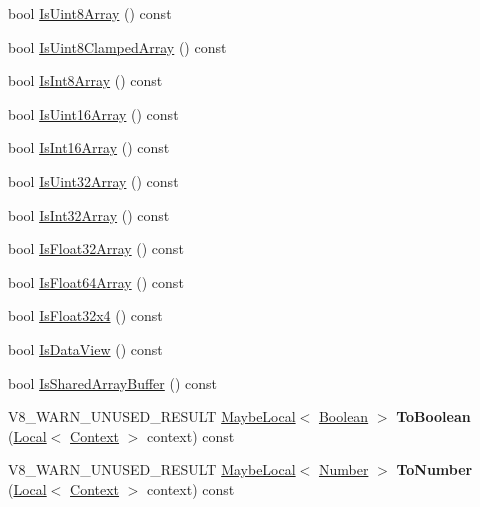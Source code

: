 \begin{DoxyCompactItemize}
bool \hyperlink{classv8_1_1Value_acbe2cd9c9cce96ee498677ba37c8466d}{Is\+Uint8\+Array} () const 
\item 
bool \hyperlink{classv8_1_1Value_ad3cb464ab5ef0215bd2cbdd4eb2b7e3d}{Is\+Uint8\+Clamped\+Array} () const 
\item 
bool \hyperlink{classv8_1_1Value_a10a88a2794271dfcd9c3abd565e8f28a}{Is\+Int8\+Array} () const 
\item 
bool \hyperlink{classv8_1_1Value_a4a45fabf58b241f5de3086a3dd0a09ae}{Is\+Uint16\+Array} () const 
\item 
bool \hyperlink{classv8_1_1Value_a928c586639dd75ae4efdaa66b1fc4d50}{Is\+Int16\+Array} () const 
\item 
bool \hyperlink{classv8_1_1Value_a5e39229dc74d534835cf4ceba10676f4}{Is\+Uint32\+Array} () const 
\item 
bool \hyperlink{classv8_1_1Value_a48eac78a49c8b42d9f8cf05c514b3750}{Is\+Int32\+Array} () const 
\item 
bool \hyperlink{classv8_1_1Value_a4effc7ca1a221dd8c1e23c0f28145ef0}{Is\+Float32\+Array} () const 
\item 
bool \hyperlink{classv8_1_1Value_a293f140b81b0219d1497e937ed948b1e}{Is\+Float64\+Array} () const 
\item 
bool \hyperlink{classv8_1_1Value_ab071bf567d89c8ce1489b1b7d93abc36}{Is\+Float32x4} () const 
\item 
bool \hyperlink{classv8_1_1Value_afd20ab51e79658acc405c12dad2260ab}{Is\+Data\+View} () const 
\item 
bool \hyperlink{classv8_1_1Value_aa4ce26f174a4c1823dec56eb946d3134}{Is\+Shared\+Array\+Buffer} () const 
\item 
\hypertarget{classv8_1_1Value_a40a62da1dd52184cc4c1fd735c538f8b}{}V8\+\_\+\+W\+A\+R\+N\+\_\+\+U\+N\+U\+S\+E\+D\+\_\+\+R\+E\+S\+U\+L\+T \hyperlink{classv8_1_1MaybeLocal}{Maybe\+Local}$<$ \hyperlink{classv8_1_1Boolean}{Boolean} $>$ {\bfseries To\+Boolean} (\hyperlink{classv8_1_1Local}{Local}$<$ \hyperlink{classv8_1_1Context}{Context} $>$ context) const \label{classv8_1_1Value_a40a62da1dd52184cc4c1fd735c538f8b}

\item 
\hypertarget{classv8_1_1Value_a9fa8386aa436c2b83c9af6a65b8a2cad}{}V8\+\_\+\+W\+A\+R\+N\+\_\+\+U\+N\+U\+S\+E\+D\+\_\+\+R\+E\+S\+U\+L\+T \hyperlink{classv8_1_1MaybeLocal}{Maybe\+Local}$<$ \hyperlink{classv8_1_1Number}{Number} $>$ {\bfseries To\+Number} (\hyperlink{classv8_1_1Local}{Local}$<$ \hyperlink{classv8_1_1Context}{Context} $>$ context) const \label{classv8_1_1Value_a9fa8386aa436c2b83c9af6a65b8a2cad}


\end{DoxyCompactItemize}
